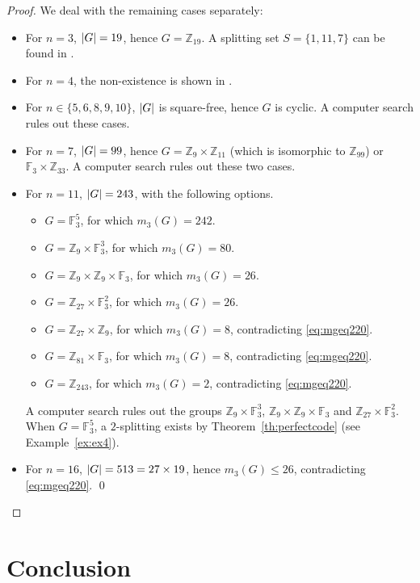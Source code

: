 \documentclass[sort&compress]{elsarticle}
\DeclarePairedDelimiter\abs{\lvert}{\rvert}
\renewcommand{\leq}{\leqslant}
\newcommand{\F}{\mathbb{F}}
\newcommand{\Z}{\mathbb{Z}}
\begin{document}
\begin{proof}
      We deal with the remaining cases separately:
      \begin{itemize}
      \item
        For $n=3$, $\abs{G}=19$, hence $G=\Z_{19}$.  A splitting set
        $S=\{1,11,7\}$ can be found in \cite[Theorem 6]{BuzEtz12}.
      \item
        For $n=4$, the non-existence is shown in \cite[Corollary
          6]{BuzEtz12}.
      \item
        For $n\in\{5,6,8,9, 10\}$, $\abs{G}$ is square-free, hence $G$ is
        cyclic. A computer search rules out these cases.
      \item 
        For $n=7$, $\abs{G}=99$, hence $G=\Z_{9}\times \Z_{11}$ (which is isomorphic to $\Z_{99}$) or
        $\F_{3}\times \Z_{33}$. A computer search rules out these two
        cases.
      \item For $n=11$, $\abs{G}=243$, with the following options. 
        \begin{itemize}
        \item
          $G=\F_3^5$, for which $m_3(G)=242$.
        \item
          $G=\Z_9\times\F_3^3$, for which $m_3(G)=80$.
        \item 
          $G=\Z_9\times\Z_9 \times \F_3$, for which $m_3(G)=26$.
        \item 
          $G=\Z_{27} \times \F_3^2$, for which $m_3(G)=26$.
        \item 
          $G=\Z_{27} \times \Z_9$, for which $m_3(G)=8$, contradicting
          \eqref{eq:mgeq220}.
        \item 
          $G=\Z_{81} \times \F_3$, for which $m_3(G)=8$, contradicting
          \eqref{eq:mgeq220}.
        \item 
          $G=\Z_{243}$, for which $m_3(G)=2$,
          contradicting \eqref{eq:mgeq220}.
        \end{itemize}
        A computer search rules out the groups $\Z_9\times\F_3^3$,
        $\Z_9\times\Z_9 \times \F_3$ and $\Z_{27} \times \F_3^2$.
        When $G=\F_3^5$, a $2$-splitting exists by
        Theorem~\ref{th:perfectcode} (see Example~\ref{ex:ex4}).
      \item
        For $n=16$, $\abs{G}=513=27\times 19$, hence $m_3(G)\leq 26$,
        contradicting \eqref{eq:mgeq220}. \qed
      \end{itemize}  
    \end{proof}
  
\section{Conclusion}
\label{sec:conclude}
\end{document}

